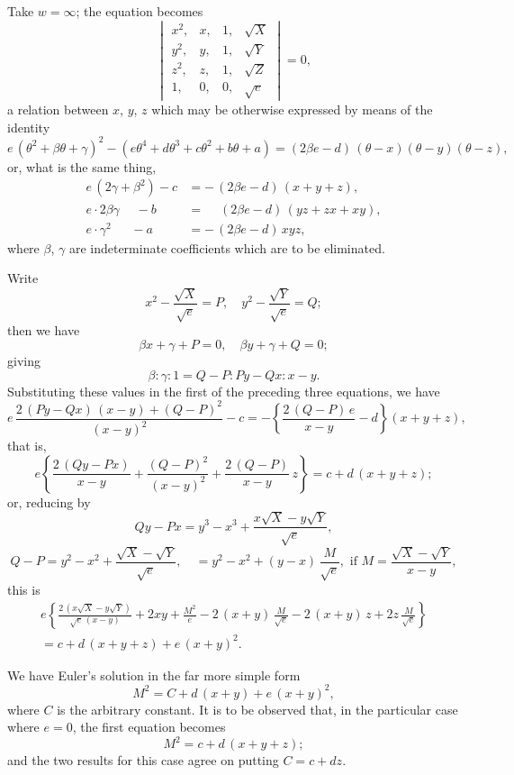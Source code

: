 \documentclass[11pt,a4paper]{book}
\begin{document}
\noindent
Take $w = \infty$; the equation becomes
\[
\begin{vmatrix}
x^2, & x, & 1, & \surd X \\
y^2, & y, & 1, & \surd Y \\
z^2, & z, & 1, & \surd Z \\
1, & 0, & 0, & \surd e
\end{vmatrix} = 0,
\]
a relation between $x$, $y$, $z$ which may be otherwise expressed by means of the identity
\[
e\,(\theta^2 + \beta\theta + \gamma)^2 - (e\theta^4 + d\theta^3 + c\theta^2 + b\theta + a) = (2\beta e - d)\,(\theta - x)(\theta - y)(\theta - z),
\]
or, what is the same thing,
\begin{align*}
e\,(2\gamma + \beta^2) - c &= -\,(2\beta e - d)\,(x+y+z), \\
e \cdot 2\beta\gamma \quad\; - b &= \phantom{-}(2\beta e - d)\,(yz + zx + xy), \\
e \cdot \gamma^2 \quad\;\; - a &= -\,(2\beta e - d)\,xyz,
\end{align*}
where $\beta$, $\gamma$ are indeterminate coefficients which are to be eliminated.

Write
\[
x^2 - \frac{\surd X}{\surd e} = P, \quad y^2 - \frac{\surd Y}{\surd e} = Q;
\]
then we have
\[
\beta x + \gamma + P = 0, \quad \beta y + \gamma + Q = 0;
\]
giving
\[
\beta : \gamma : 1 = Q - P : Py - Qx : x - y.
\]
Substituting these values in the first of the preceding three equations, we have
\[
e\,\frac{2\,(Py - Qx)\,(x-y) + (Q-P)^2}{(x-y)^2} - c = -\left\{\frac{2\,(Q-P)\,e}{x-y} - d\right\}(x+y+z),
\]
that is,
\[
e\left\{\frac{2\,(Qy - Px)}{x-y} + \frac{(Q-P)^2}{(x-y)^2} + \frac{2\,(Q-P)}{x-y}\,z\right\} = c + d\,(x+y+z);
\]
or, reducing by
\[
Qy - Px = y^3 - x^3 + \frac{x\surd X - y\surd Y}{\surd e},
\]
\[
Q - P = y^2 - x^2 + \frac{\surd X - \surd Y}{\surd e}, \quad = y^2 - x^2 + (y-x)\,\frac{M}{\surd e}, \text{ if } M = \frac{\surd X - \surd Y}{x-y},
\]
this is
\begin{multline*}
e\left\{\frac{2\,(x\surd X - y\surd Y)}{\surd e\,(x-y)} + 2xy + \frac{M^2}{e} - 2\,(x+y)\,\frac{M}{\surd e} - 2\,(x+y)\,z + 2z\,\frac{M}{\surd e}\right\} \\
= c + d\,(x+y+z) + e\,(x+y)^2.
\end{multline*}

We have Euler's solution in the far more simple form
\[
M^2 = C + d\,(x+y) + e\,(x+y)^2,
\]
where $C$ is the arbitrary constant. It is to be observed that, in the particular case where $e = 0$, the first equation becomes
\[
M^2 = c + d\,(x+y+z);
\]
and the two results for this case agree on putting $C = c + dz$.
\end{document}
